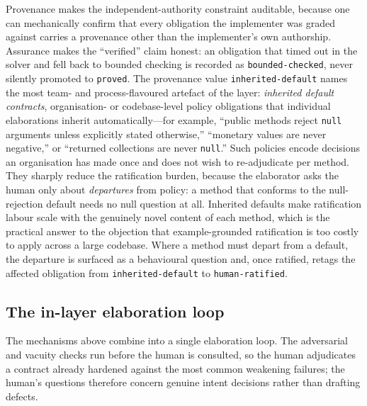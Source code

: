 Provenance makes the independent-authority constraint auditable, because one can mechanically confirm that every obligation the implementer was graded against carries a provenance other than the implementer's own authorship. Assurance makes the ``verified'' claim honest: an obligation that timed out in the solver and fell back to bounded checking is recorded as \texttt{bounded-checked}, never silently promoted to \texttt{proved}. The provenance value \texttt{inherited-default} names the most team- and process-flavoured artefact of the layer: \emph{inherited default contracts}, organisation- or codebase-level policy obligations that individual elaborations inherit automatically---for example, ``public methods reject \lstinline|null| arguments unless explicitly stated otherwise,'' ``monetary values are never negative,'' or ``returned collections are never \lstinline|null|.'' Such policies encode decisions an organisation has made once and does not wish to re-adjudicate per method. They sharply reduce the ratification burden, because the elaborator asks the human only about \emph{departures} from policy: a method that conforms to the null-rejection default needs no null question at all. Inherited defaults make ratification labour scale with the genuinely novel content of each method, which is the practical answer to the objection that example-grounded ratification is too costly to apply across a large codebase. Where a method must depart from a default, the departure is surfaced as a behavioural question and, once ratified, retags the affected obligation from \texttt{inherited-default} to \texttt{human-ratified}.

\subsection{The in-layer elaboration loop}\label{subsec:a5-elabloop}

The mechanisms above combine into a single elaboration loop. The adversarial and vacuity checks run before the human is consulted, so the human adjudicates a contract already hardened against the most common weakening failures; the human's questions therefore concern genuine intent decisions rather than drafting defects.

